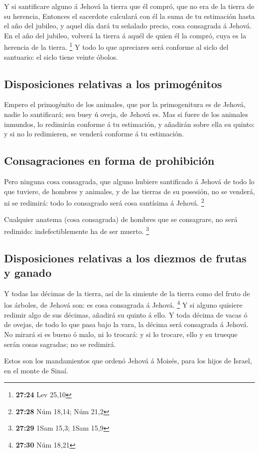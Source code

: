  Y si santificare alguno á Jehová la tierra que él
compró, que no era de la tierra de su herencia,  Entonces
el sacerdote calculará con él la suma de tu estimación hasta el año del
jubileo, y aquel día dará tu señalado precio, cosa consagrada á Jehová.
 En el año del jubileo, volverá la tierra á aquél de
quien él la compró, cuya es la herencia de la tierra. \footnote{\textbf{27:24}
  Lev 25,10}  Y todo lo que apreciares será conforme al
siclo del santuario: el siclo tiene veinte óbolos.

\hypertarget{disposiciones-relativas-a-los-primoguxe9nitos}{%
\subsection{Disposiciones relativas a los
primogénitos}\label{disposiciones-relativas-a-los-primoguxe9nitos}}

 Empero el primogénito de los animales, que por la
primogenitura es de Jehová, nadie lo santificará; sea buey ú oveja, de
Jehová es.  Mas si fuere de los animales inmundos, lo
redimirán conforme á tu estimación, y añadirán sobre ella su quinto: y
si no lo redimieren, se venderá conforme á tu estimación.

\hypertarget{consagraciones-en-forma-de-prohibiciuxf3n}{%
\subsection{Consagraciones en forma de
prohibición}\label{consagraciones-en-forma-de-prohibiciuxf3n}}

 Pero ninguna cosa consagrada, que alguno hubiere
santificado á Jehová de todo lo que tuviere, de hombres y animales, y de
las tierras de su posesión, no se venderá, ni se redimirá: todo lo
consagrado será cosa santísima á Jehová. \footnote{\textbf{27:28} Núm
  18,14; Núm 21,2}

 Cualquier anatema (cosa consagrada) de hombres que se
consagrare, no será redimido: indefectiblemente ha de ser muerto.
\footnote{\textbf{27:29} 1Sam 15,3; 1Sam 15,9}

\hypertarget{disposiciones-relativas-a-los-diezmos-de-frutas-y-ganado}{%
\subsection{Disposiciones relativas a los diezmos de frutas y
ganado}\label{disposiciones-relativas-a-los-diezmos-de-frutas-y-ganado}}

 Y todas las décimas de la tierra, así de la simiente de
la tierra como del fruto de los árboles, de Jehová son: es cosa
consagrada á Jehová. \footnote{\textbf{27:30} Núm 18,21} 
Y si alguno quisiere redimir algo de sus décimas, añadirá su quinto á
ello.  Y toda décima de vacas ó de ovejas, de todo lo que
pasa bajo la vara, la décima será consagrada á Jehová. 
No mirará si es bueno ó malo, ni lo trocará: y si lo trocare, ello y su
trueque serán cosas sagradas; no se redimirá.

 Estos son los mandamientos que ordenó Jehová á Moisés,
para los hijos de Israel, en el monte de Sinaí.
